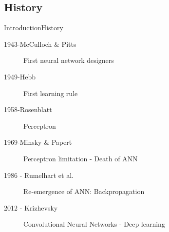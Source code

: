 \documentclass[10pt,compress]{beamer} %
\begin{document}
\subsection{History}
\begin{frame}{Introduction}{History}
	\begin{description}
	\item[1943-McCulloch \& Pitts] First neural network designers
	\item[1949-Hebb] First learning rule
	\item[1958-Rosenblatt] Perceptron
	\item[1969-Minsky \& Papert]  Perceptron limitation - Death of ANN
	\item[1986 - Rumelhart et al.] Re-emergence of ANN: Backpropagation
	\item[2012 - Krizhevsky] Convolutional Neural Networks - Deep learning
	\end{description}
\end{frame}
\end{document}
